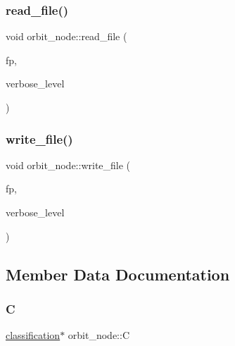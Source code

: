 \mbox{\label{classorbit__node_a25962200ff16e51b7189e516e92a81af}} 
\subsubsection{\texorpdfstring{read\+\_\+file()}{read\_file()}}
{\footnotesize\ttfamily void orbit\+\_\+node\+::read\+\_\+file (\begin{DoxyParamCaption}\item[{ifstream \&}]{fp,  }\item[{\mbox{\hyperlink{galois_8h_a09fddde158a3a20bd2dcadb609de11dc}{I\+NT}}}]{verbose\+\_\+level }\end{DoxyParamCaption})}

\mbox{\label{classorbit__node_a4ce61fe0a32a2fc5768effc348a84b1e}} 
\subsubsection{\texorpdfstring{write\+\_\+file()}{write\_file()}}
{\footnotesize\ttfamily void orbit\+\_\+node\+::write\+\_\+file (\begin{DoxyParamCaption}\item[{ofstream \&}]{fp,  }\item[{\mbox{\hyperlink{galois_8h_a09fddde158a3a20bd2dcadb609de11dc}{I\+NT}}}]{verbose\+\_\+level }\end{DoxyParamCaption})}



\subsection{Member Data Documentation}
\mbox{\label{classorbit__node_ae7271bc8e762406e0b94f208a2b99230}} 
\subsubsection{\texorpdfstring{C}{C}}
{\footnotesize\ttfamily \mbox{\hyperlink{classclassification}{classification}}$\ast$ orbit\+\_\+node\+::C}

